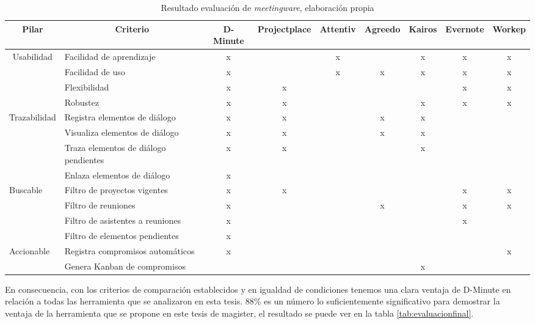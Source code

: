 \begin{table}[!h]
\centering
\caption{Resultado evaluación de \textit{meetingware}, elaboración propia}
\label{tab:resultadoevaluacion}
\resizebox{15cm}{!} {
\begin{tabular}{|l|l|c|c|c|c|c|c|c|}
\hline
\multicolumn{1}{|c|}{Pilar} & \multicolumn{1}{c|}{Criterio} & D-Minute & Projectplace & Attentiv & Agreedo & Kairos & Evernote & Workep \\ \hline
\multicolumn{1}{|c|}{\multirow{4}{*}{Usabilidad}} & Facilidad de aprendizaje & x &  & x &  & x & x & x \\ \cline{2-9} 
\multicolumn{1}{|c|}{} & Facilidad de uso & x &  & x & x & x & x & x \\ \cline{2-9} 
\multicolumn{1}{|c|}{} & Flexibilidad & x & x &  &  &  & x & x \\ \cline{2-9} 
\multicolumn{1}{|c|}{} & Robustez & x & x &  &  & x & x & x \\ \hline
\multirow{4}{*}{Trazabilidad} & Registra elementos de diálogo & x & x &  & x & x &  &  \\ \cline{2-9} 
 & Visualiza elementos de diálogo & x & x &  & x & x &  &  \\ \cline{2-9} 
 & Traza elementos de diálogo pendientes & x & x &  &  & x &  &  \\ \cline{2-9} 
 & Enlaza elementos de diálogo & x &  &  &  &  &  &  \\ \hline
\multirow{4}{*}{Buscable} & Filtro de proyectos vigentes & x & x &  &  &  & x & x \\ \cline{2-9} 
 & Filtro de reuniones & x &  &  & x &  & x & x \\ \cline{2-9} 
 & Filtro de asistentes a reuniones & x &  &  &  &  & x &  \\ \cline{2-9} 
 & Filtro de elementos pendientes & x &  &  &  &  &  &  \\ \hline
\multirow{2}{*}{Accionable} & Registra compromisos automáticos & x &  &  &  &  &  & x \\ \cline{2-9} 
 & Genera Kanban de compromisos &  &  &  &  & x &  &  \\ \hline
\end{tabular}
}
\end{table}

En consecuencia, con los criterios de comparación establecidos y en igualdad de condiciones tenemos una clara ventaja de D-Minute en relación a todas las herramienta que se analizaron en esta tesis. 88\% es un número lo suficientemente significativo para demostrar la ventaja de la herramienta que se propone en este tesis de magister, el resultado se puede ver en la tabla \ref{tab:evaluacionfinal}.


